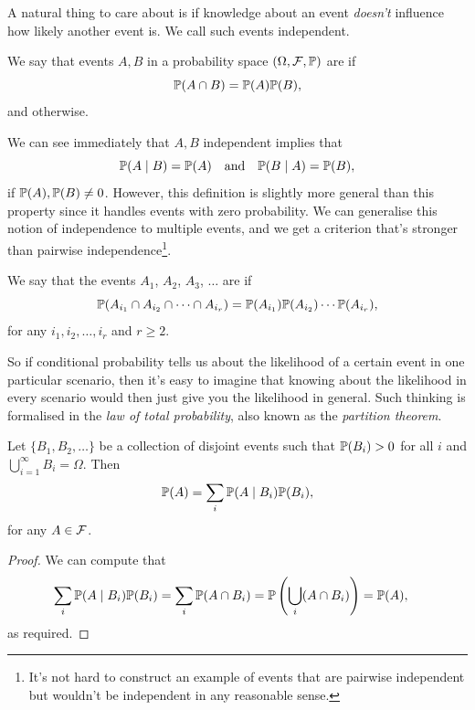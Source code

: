 \documentclass[a4paper]{scrartcl}
\begin{document}
A natural thing to care about is if knowledge about an event \emph{doesn't} influence how likely another event is. We call such events independent.

\begin{definition}
We say that events $A, B$ in a probability space $(\Omega, \mathcal{F}, \mathbb{P})$ are  if
$$
\mathbb{P}(A \cap B) = \mathbb{P}(A) \mathbb{P}(B),
$$
and  otherwise.
\end{definition}

We can see immediately that $A, B$ independent implies that
$$
\mathbb{P}(A \mid B) = \mathbb{P}(A) \quad \text{and} \quad \mathbb{P}(B \mid A) = \mathbb{P}(B),
$$
if $\mathbb{P}(A), \mathbb{P}(B) \neq 0$. However, this definition is slightly more general than this property since it handles events with zero probability.
We can generalise this notion of independence to multiple events, and we get a criterion that's stronger than pairwise independence\footnote{It's not hard to construct an example of events that are pairwise independent but wouldn't be independent in any reasonable sense.}.

\begin{definition}
	We say that the events $A_1$, $A_2$, $A_3$, $\dots$ are  if
	$$
	\mathbb{P}(A_{i_1} \cap A_{i_2} \cap \cdots \cap A_{i_r}) = \mathbb{P}(A_{i_1}) \mathbb{P}(A_{i_2}) \cdots \mathbb{P}(A_{i_r}),
	$$
	for any $i_1, i_2, \dots, i_r$ and $r \geq 2$.
\end{definition}

So if conditional probability tells us about the likelihood of a certain event in one particular scenario, then it's easy to imagine that knowing about the likelihood in every scenario would then just give you the likelihood in general. Such thinking is formalised in the \emph{law of total probability}, also known as the \emph{partition theorem}.

\begin{theorem}
	Let $\{B_1, B_2, \dots\}$ be a collection of disjoint events such that $\mathbb{P}(B_i) > 0$ for all $i$ and $\bigcup_{i = 1}^{\infty} B_i = \Omega$. Then
	$$
	\mathbb{P}(A) = \sum_i \mathbb{P}(A \mid B_i) \mathbb{P}(B_i),
	$$
	for any $A \in \mathcal{F}$.
\end{theorem}
\begin{proof}
	We can compute that
	\begin{align*}
		\sum_{i} \mathbb{P}(A \mid B_i) \mathbb{P}(B_i) &= \sum_i \mathbb{P}(A \cap B_i) = \mathbb{P}\left(\bigcup_i (A \cap B_i)\right) = \mathbb{P}(A),
	\end{align*}
	as required.
\end{proof}
\end{document}
